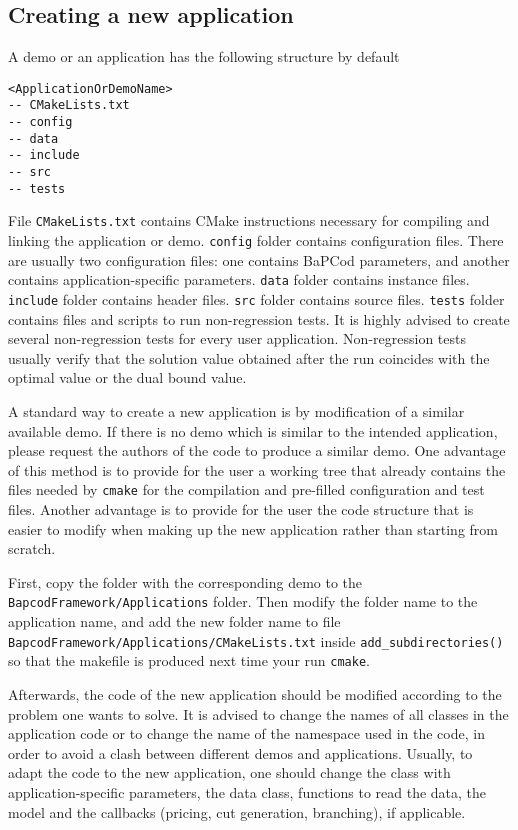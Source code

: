 \documentclass[10pt,a4paper]{article}
\newcommand{\bc}{BaPCod\xspace}
\begin{document}
\subsection{Creating a new application}
\label{sec:newapp}  

A demo or an application has the following structure by default 
\begin{Verbatim}
<ApplicationOrDemoName>
-- CMakeLists.txt
-- config
-- data
-- include
-- src
-- tests
\end{Verbatim}

File \verb+CMakeLists.txt+ contains CMake instructions necessary for compiling and linking the
application or demo. \verb+config+ folder contains configuration files. There are usually two configuration files: one
contains \bc parameters, and another contains application-specific parameters. \verb+data+ folder contains instance
files. \verb+include+ folder contains header files. \verb+src+ folder contains source files. \verb+tests+ folder
contains files and scripts to run non-regression tests. It is highly advised to create several  non-regression tests for
every user application. Non-regression tests usually verify that the solution value obtained after the run coincides
with the optimal value or the dual bound value.

A standard way to create a new application is by modification of a similar available demo. If there is no demo which is
similar to the intended application, please request the authors of the code to produce a similar demo. One advantage of
this method is to provide for the user a working tree that already contains the files needed by \verb+cmake+ for the
compilation and pre-filled configuration and test files. Another advantage is to provide for the user the code structure
that is easier to modify when making up the new application rather than starting from scratch.

First, copy the folder with the corresponding demo to the\\ \verb+BapcodFramework/Applications+ folder. Then modify the
folder name to the application name, and add the new folder name to file\\
\verb+BapcodFramework/Applications/CMakeLists.txt+ inside \verb+add_subdirectories()+ so that the makefile is produced
next time your run \verb+cmake+.

Afterwards, the code of the new application should be modified according to the problem one wants to solve. It is
advised to change the names of all classes in the application code or to change the name of the namespace used in the
code, in order to avoid a clash between different demos and applications. Usually, to adapt the code to the new
application, one should change the class with application-specific parameters, the data class, functions to read the
data, the model and the callbacks (pricing, cut generation, branching), if applicable.
\end{document}
